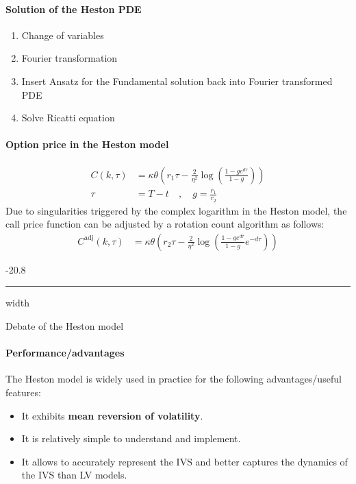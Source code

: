 \documentclass[a4paper,landscape,7pt,fleqn]{scrartcl}
\makeatletter
\renewcommand{\emph}[1]{\textbf{#1}}
\renewcommand{\subsubsection}{\@startsection{subsubsection}{1}{0mm}%
{-2\baselineskip}{0.8\baselineskip}%
{\hrule depth 0.2pt width\columnwidth\vspace*{1.2em}\normalsize\bfseries}}
\makeatother
\begin{document}
\begin{multicols*}{3}
\paragraph{Solution of the Heston PDE}
\begin{enumerate}
\item Change of variables
\item Fourier transformation
\item Insert Ansatz for the Fundamental solution back into Fourier transformed PDE
\item Solve Ricatti equation
\end{enumerate}

\paragraph{Option price in the Heston model}
\begin{align*}
C(k,\tau) &= \kappa \theta \left( r_1 \tau - \frac{2}{\eta^2} \log \left( \frac{1 - g e^{d \tau}}{1 - g} \right) \right) \\
\tau &= T-t \quad , \quad g = \frac{r_1}{r_2}
\end{align*}
Due to singularities triggered by the complex logarithm in the Heston model, the call price function can be adjusted by a rotation count algorithm as follows:
\begin{align*}
C^\text{adj}(k,\tau) &= \kappa \theta \left( r_2 \tau - \frac{2}{\eta^2} \log \left( \frac{1 - g e^{d \tau}}{1 - g} e^{-d \tau} \right) \right)
\end{align*}

\subsubsection{Debate of the Heston model}

\paragraph{Performance/advantages}
The Heston model is widely used in practice for the following advantages/useful features:
\begin{itemize}
\item It exhibits \emph{mean reversion of volatility}.
\item It is relatively simple to understand and implement.
\item It allows to accurately represent the IVS and better captures the dynamics of the IVS than LV models.
\end{itemize}


\end{multicols*}
\end{document}
